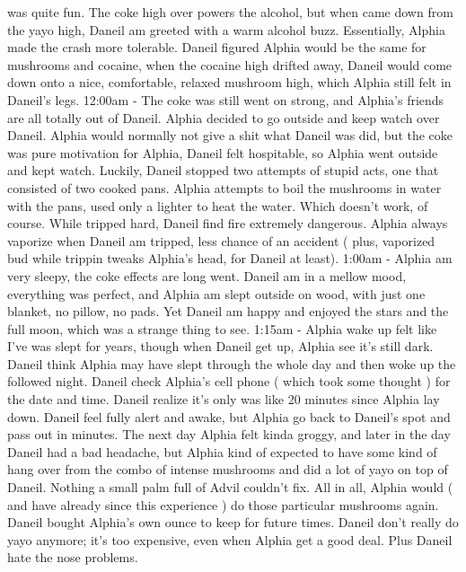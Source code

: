 \documentclass[12pt]{book}
\begin{document}
was quite fun. The coke high over powers the alcohol, but when came down from the yayo high, Daneil am greeted with a warm alcohol buzz. Essentially, Alphia made the crash more tolerable. Daneil figured Alphia would be the same for mushrooms and cocaine, when the cocaine high drifted away, Daneil would come down onto a nice, comfortable, relaxed mushroom high, which Alphia still felt in Daneil's legs. 12:00am - The coke was still went on strong, and Alphia's friends are all totally out of Daneil. Alphia decided to go outside and keep watch over Daneil. Alphia would normally not give a shit what Daneil was did, but the coke was pure motivation for Alphia, Daneil felt hospitable, so Alphia went outside and kept watch. Luckily, Daneil stopped two attempts of stupid acts, one that consisted of two cooked pans. Alphia attempts to boil the mushrooms in water with the pans, used only a lighter to heat the water. Which doesn't work, of course. While tripped hard, Daneil find fire extremely dangerous. Alphia always vaporize when Daneil am tripped, less chance of an accident ( plus, vaporized bud while trippin tweaks Alphia's head, for Daneil at least). 1:00am - Alphia am very sleepy, the coke effects are long went. Daneil am in a mellow mood, everything was perfect, and Alphia am slept outside on wood, with just one blanket, no pillow, no pads. Yet Daneil am happy and enjoyed the stars and the full moon, which was a strange thing to see. 1:15am - Alphia wake up felt like I've was slept for years, though when Daneil get up, Alphia see it's still dark. Daneil think Alphia may have slept through the whole day and then woke up the followed night. Daneil check Alphia's cell phone ( which took some thought ) for the date and time. Daneil realize it's only was like 20 minutes since Alphia lay down. Daneil feel fully alert and awake, but Alphia go back to Daneil's spot and pass out in minutes. The next day Alphia felt kinda groggy, and later in the day Daneil had a bad headache, but Alphia kind of expected to have some kind of hang over from the combo of intense mushrooms and did a lot of yayo on top of Daneil. Nothing a small palm full of Advil couldn't fix. All in all, Alphia would ( and have already since this experience ) do those particular mushrooms again. Daneil bought Alphia's own ounce to keep for future times. Daneil don't really do yayo anymore; it's too expensive, even when Alphia get a good deal. Plus Daneil hate the nose problems.
\end{document}
